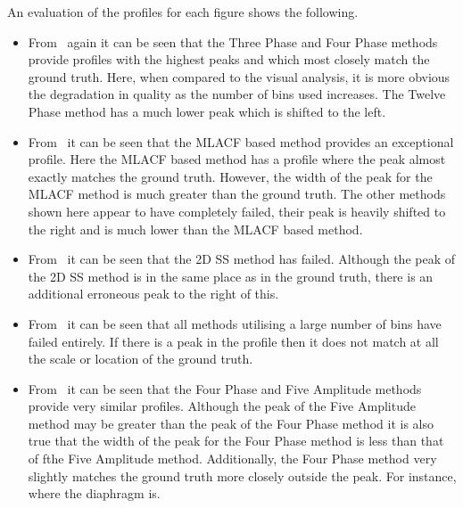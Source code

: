            An evaluation of the profiles for each figure shows the following.

            \begin{itemize}
                \item From~ again it can be seen that the Three Phase and Four Phase methods provide profiles with the highest peaks and which most closely match the ground truth. Here, when compared to the visual analysis, it is more obvious the degradation in quality as the number of bins used increases. The Twelve Phase method has a much lower peak which is shifted to the left.

                \item From~ it can be seen that the \gls{MLACF} based method provides an exceptional profile. Here the \gls{MLACF} based method has a profile where the peak almost exactly matches the ground truth. However, the width of the peak for the \gls{MLACF} method is much greater than the ground truth. The other methods shown here appear to have completely failed, their peak is heavily shifted to the right and is much lower than the \gls{MLACF} based method.

                \item From~ it can be seen that the \gls{2D} \gls{SS} method has failed. Although the peak of the \gls{2D} \gls{SS} method is in the same place as in the ground truth, there is an additional erroneous peak to the right of this.

                \item From~ it can be seen that all methods utilising a large number of bins have failed entirely. If there is a peak in the profile then it does not match at all the scale or location of the ground truth.

                \item From~ it can be seen that the Four Phase and Five Amplitude methods provide very similar profiles. Although the peak of the Five Amplitude method may be greater than the peak of the Four Phase method it is also true that the width of the peak for the Four Phase method is less than that of fthe Five Amplitude method. Additionally, the Four Phase method very slightly matches the ground truth more closely outside the peak. For instance, where the diaphragm is.
            \end{itemize}

